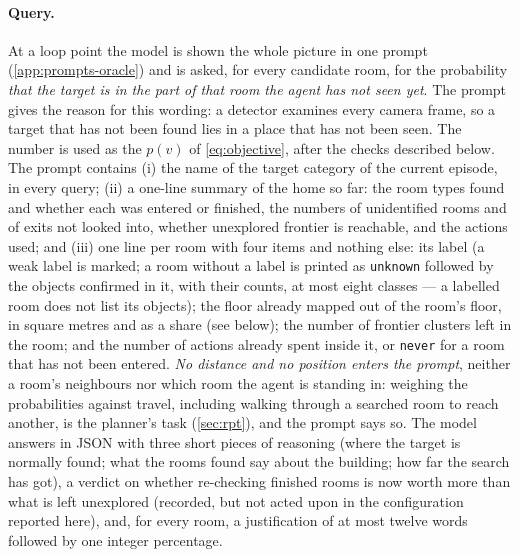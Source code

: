 \documentclass[10pt]{article}
\newcommand{\code}[1]{\texttt{#1}}
\begin{document}
\paragraph{Query.} At a loop point the model is shown the whole picture in one
prompt (\cref{app:prompts-oracle}) and is asked, for every candidate room, for
the probability \emph{that the target is in the part of that room the agent
has not seen yet}. The prompt gives the reason for this wording: a detector
examines every camera frame, so a target that has not been found lies in a
place that has not been seen. The number is used as
the $p(v)$ of \cref{eq:objective}, after the checks described below. The
prompt contains
(i) the name of the target category of the current episode, in every query;
(ii) a one-line summary of the home so far: the room types found and whether
each was entered or finished, the numbers of unidentified rooms and of exits
not looked into, whether unexplored frontier is reachable, and the actions
used; and
(iii) one line per room with four items and nothing else: its label (a weak
label is marked; a room without a label is printed as \code{unknown} followed
by the objects confirmed in it, with their counts, at most eight classes --- a
labelled room does not list its objects); the floor already mapped out of the
room's floor, in square metres and as a share (see below); the number of
frontier clusters left in the room; and the number of actions already spent
inside it, or \code{never} for a room that has not been entered.
\emph{No distance and no position enters the prompt}, neither a room's
neighbours nor which room the agent is standing in: weighing the probabilities
against travel, including walking through a searched room to reach another, is
the planner's task (\cref{sec:rpt}), and the prompt says so. The model
answers in
JSON with three short pieces of reasoning (where the target is normally found;
what the rooms found say about the building; how far the search has got), a
verdict on whether re-checking finished rooms is now worth more than what is
left unexplored (recorded, but not acted upon in the configuration reported
here), and, for every room, a justification of at most twelve words followed by
one integer percentage.
\end{document}

